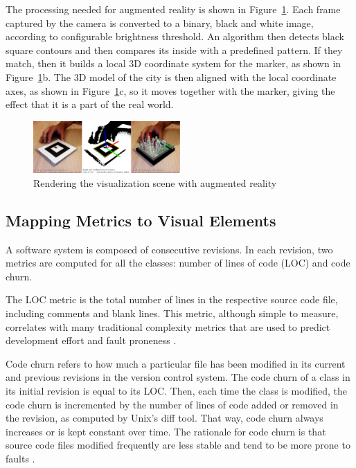 The processing needed for augmented reality is shown in Figure~\ref{fig:rendering_visualization}. Each frame captured by the camera is converted to a binary, black and white image, according to configurable brightness threshold. An algorithm then detects black square contours and then compares its inside with a predefined pattern. If they match, then it builds a local 3D coordinate system for the marker, as shown in Figure~\ref{fig:rendering_visualization}b. The 3D model of the city is then aligned with the local coordinate axes, as shown in Figure~\ref{fig:rendering_visualization}c, so it moves together with the marker, giving the effect that it is a part of the real world.

\begin{figure}[ht!]
 \centering
 \includegraphics[width=0.5\textwidth, bb=14 14 1343 490]{./images/visualizationRedering}
 \caption{Rendering the visualization scene with augmented reality}
 \label{fig:rendering_visualization}
\end{figure}

\subsection{Mapping Metrics to Visual Elements} \label{sec:metrics_visual_elements}
A software system is composed of consecutive revisions. In each revision, two metrics are computed for all the classes: number of lines of code (LOC) and code churn. 

The LOC metric is the total number of lines in the respective source code file, including comments and blank lines. This metric, although simple to measure, correlates with many traditional complexity metrics that are used to predict development effort and fault proneness \cite{elemam:2001}.

Code churn refers to how much a particular file has been modified in its current and previous revisions in the version control system. The code churn of a class in its initial revision is equal to its LOC. Then, each time the class is modified, the code churn is incremented by the number of lines of code added or removed in the revision, as computed by Unix's diff tool. That way, code churn always increases or is kept constant over time. The rationale for code churn is that source code files modified frequently are less stable and tend to be more prone to faults \cite{nagappan:2005}.

